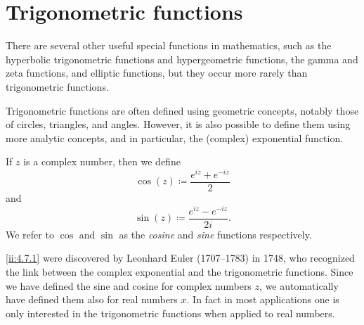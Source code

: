 \section{Trigonometric functions}\label{ii:sec:4.7}

\begin{note}
  There are several other useful special functions in mathematics, such as the hyperbolic trigonometric functions and hypergeometric functions, the gamma and zeta functions, and elliptic functions, but they occur more rarely than trigonometric functions.
\end{note}

\begin{note}
  Trigonometric functions are often defined using geometric concepts, notably those of circles, triangles, and angles.
  However, it is also possible to define them using more analytic concepts, and in particular, the (complex) exponential function.
\end{note}

\begin{defn}\label{ii:4.7.1}
  If \(z\) is a complex number, then we define
  \[
    \cos(z) \coloneqq \dfrac{e^{iz} + e^{-iz}}{2}
  \]
  and
  \[
    \sin(z) \coloneqq \dfrac{e^{iz} - e^{-iz}}{2i}.
  \]
  We refer to \(\cos\) and \(\sin\) as the \emph{cosine} and \emph{sine} functions respectively.
\end{defn}

\begin{note}
  \cref{ii:4.7.1} were discovered by Leonhard Euler (1707--1783) in 1748, who recognized the link between the complex exponential and the trigonometric functions.
  Since we have defined the sine and cosine for complex numbers \(z\), we automatically have defined them also for real numbers \(x\).
  In fact in most applications one is only interested in the trigonometric functions when applied to real numbers.
\end{note}


